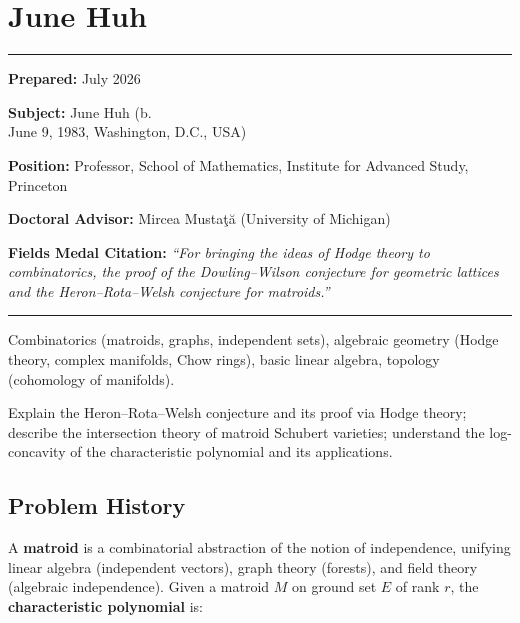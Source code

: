 \chapter{June Huh}\label{ch2022junehuh:june-huh-fields-medal-2022-a-comprehensive-report-on-his-work-and-impact}

\begin{center}\rule{0.5\linewidth}{0.5pt}\end{center}

\textbf{Prepared:} July 2026

\textbf{Subject:} June Huh (b.\\ June 9, 1983, Washington, D.C., USA)

\textbf{Position:} Professor, School of Mathematics, Institute for Advanced Study, Princeton

\textbf{Doctoral Advisor:} Mircea Musta\c{t}\u{a} (University of Michigan)

\textbf{Fields Medal Citation:} \emph{``For bringing the ideas of Hodge theory to combinatorics, the proof of the Dowling--Wilson conjecture for geometric lattices and the Heron--Rota--Welsh conjecture for matroids.''}

\begin{center}\rule{0.5\linewidth}{0.5pt}\end{center}

\begin{prereqs}
Combinatorics (matroids, graphs, independent sets), algebraic geometry (Hodge theory, complex manifolds, Chow rings), basic linear algebra, topology (cohomology of manifolds).
\end{prereqs}

\begin{objectives}
Explain the Heron--Rota--Welsh conjecture and its proof via Hodge theory; describe the intersection theory of matroid Schubert varieties; understand the log-concavity of the characteristic polynomial and its applications.
\end{objectives}

\section{Problem History}

A \textbf{matroid} is a combinatorial abstraction of the notion of independence, unifying linear algebra (independent vectors), graph theory (forests), and field theory (algebraic independence). Given a matroid $M$ on ground set $E$ of rank $r$, the \textbf{characteristic polynomial} is:

